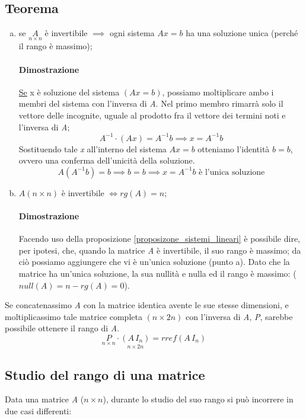 		\subsection{Teorema}
			\begin{enumerate}[(a)]
				\item se $\underset{ n \times n }{A}$ è invertibile $ \implies $ ogni sistema $ Ax = b $ ha una soluzione unica (perché il rango è massimo);
				\begin{GrayBox}
					\paragraph{Dimostrazione}
					\underline{Se} x è soluzione del sistema $(Ax=b)$, possiamo moltiplicare ambo i membri del sistema con l'inversa di \textit{A}. Nel primo membro rimarrà solo il vettore delle incognite, uguale al prodotto fra il vettore dei termini noti e l'inversa di \textit{A};
					$$ A^{-1} \cdot (Ax) = A^{-1} b \implies x = A^{-1} b $$
					Sostituendo tale \textit{x} all'interno del sistema $Ax=b$ otteniamo l'identità $b=b$, ovvero una conferma dell'unicità della soluzione.
					$$ A (A^{-1}b) = b \implies b = b \implies x = A^{-1} b \text{ è l'unica soluzione}$$
				\end{GrayBox}
			
				\item $A (n \times n) $  è invertibile $\iff rg(A) = n $; 
				\begin{GrayBox}
					\paragraph{Dimostrazione}
					Facendo uso della proposizione \ref{proposizone_sistemi_lineari} è possibile dire, per ipotesi, che, quando la matrice \textit{A} è invertibile, il suo rango è massimo; da ciò possiamo aggiungere che vi è un'unica soluzione (punto a). Dato che la matrice ha un'unica soluzione, la sua nullità e nulla ed il rango è massimo: ($ null(A) = n- rg(A) = 0 $).
				\end{GrayBox}
			\end{enumerate}
		
			Se concatenassimo \textit{A} con la matrice identica avente le sue stesse dimensioni, e moltiplicassimo tale matrice completa $(n \times 2n)$ con l'inversa di \textit{A}, \textit{P}, sarebbe possibile ottenere il rango di \textit{A}.
			$$ \underset{n \times n}{P} \cdot \underset{n \times 2n}{(A \, I_n)} = rref(A \, I_n) $$
			
		\subsection{Studio del rango di una matrice}
			Data una matrice \textit{A} ($n \times n$), durante lo studio del suo rango si può incorrere in due casi differenti:
